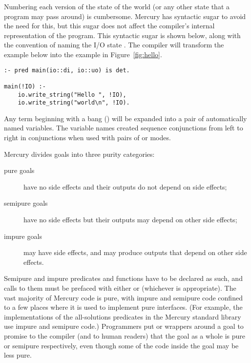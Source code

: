 Numbering each version of the state of the world
(or any other state that a program may pass around) is cumbersome.
Mercury has syntactic sugar to avoid the need for this,
but this sugar does not affect
the compiler's internal representation of the program.
This syntactic sugar is shown below, along with the convention of naming
the I/O state .
The compiler will transform the example below into the example in
Figure~\ref{fig:hello}.

\begin{verbatim}
:- pred main(io::di, io::uo) is det.

main(!IO) :-
    io.write_string("Hello ", !IO),
    io.write_string("world\n", !IO).
\end{verbatim}

\noindent
Any term beginning with a bang (\code{!})
will be expanded into a pair of automatically named
variables.
The variable names created sequence conjunctions from left to right in
conjunctions when used with pairs of  or 
modes.

\label{page:purity}
Mercury divides goals into three purity categories:

\begin{description}

    \item[pure goals] have no side effects
    and their outputs do not depend on side effects;

    \item[semipure goals] have no side effects
    but their outputs may depend on other side effects;

    \item[impure goals] may have side effects, and may produce outputs
      that depend on other side effects.

\end{description}

\noindent
Semipure and impure predicates and functions
have to be declared as such,
and calls to them must be prefaced with either
 or  (whichever is appropriate).
The vast majority of Mercury code is pure,
with impure and semipure code confined to a few places
where it is used to implement pure interfaces.
(For example, the implementations of the all-solutions predicates
in the Mercury standard library use impure and semipure code.)
Programmers put
 or  wrappers around a goal
to promise to the compiler (and to human readers) that
the goal as a whole is pure or semipure respectively,
even though some of the code inside the goal may be less pure.

